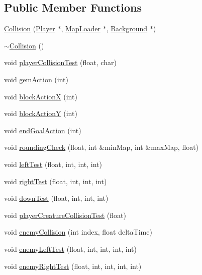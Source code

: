 \subsection*{Public Member Functions}
\begin{DoxyCompactItemize}
\item 
\hyperlink{class_collision_ad31e4037d453108a21fc186cfc27fec9}{Collision} (\hyperlink{class_player}{Player} $\ast$, \hyperlink{class_map_loader}{Map\+Loader} $\ast$, \hyperlink{class_background}{Background} $\ast$)
\item 
\hyperlink{class_collision_a19ae49bcb3b16f4622443a34a171590c}{$\sim$\+Collision} ()
\item 
void \hyperlink{class_collision_a79a33125bb8ef50a883822b4c80b71ae}{player\+Collision\+Test} (float, char)
\item 
void \hyperlink{class_collision_a8a7c7bbaa789c0867559d79ef186dd84}{gem\+Action} (int)
\item 
void \hyperlink{class_collision_a8daccc0201f916f571afbbd8da992ffb}{block\+Action\+X} (int)
\item 
void \hyperlink{class_collision_ac4b2ae74fb5978743580f25ac2760f3a}{block\+Action\+Y} (int)
\item 
void \hyperlink{class_collision_aff0b810980a84e644e531da82487d8c8}{end\+Goal\+Action} (int)
\item 
void \hyperlink{class_collision_a7b13afe2227a341d094d5bcb5e8e4905}{rounding\+Check} (float, int \&min\+Map, int \&max\+Map, float)
\item 
void \hyperlink{class_collision_a0cd628e6adcb69e216f9b469fa7c029c}{left\+Test} (float, int, int, int)
\item 
void \hyperlink{class_collision_a5aff01e79c9c42e7d71a57de7412dc58}{right\+Test} (float, int, int, int)
\item 
void \hyperlink{class_collision_a7c33a20a9c111630eeb8f0202605161e}{down\+Test} (float, int, int, int)
\item 
void \hyperlink{class_collision_ac758fa708f12d9121bb2aacc787111e4}{player\+Creature\+Collision\+Test} (float)
\item 
void \hyperlink{class_collision_a1c110f14ff463a255694f387eec17d56}{enemy\+Collision} (int index, float delta\+Time)
\item 
void \hyperlink{class_collision_a359e9c49d721476b11b43e92d7c61723}{enemy\+Left\+Test} (float, int, int, int, int)
\item 
void \hyperlink{class_collision_aa046c7cf6f057848700d89101953b678}{enemy\+Right\+Test} (float, int, int, int, int)
\end{DoxyCompactItemize}



